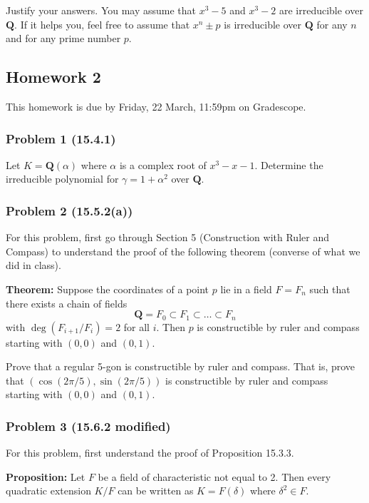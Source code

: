 \documentclass[11pt]{article}
\begin{document}
Justify your answers.
You may assume that \(x^3-5\) and \(x^3-2\) are irreducible over \(\mathbf{Q}\).  
If it helps you, feel free to assume that \(x^n \pm p\) is irreducible over \(\mathbf{Q}\) for any \(n\) and for any prime number \(p\).
\subsection{Homework 2}
\label{sec:org912c41e}
This homework is due by Friday, 22 March, 11:59pm on Gradescope.
\subsubsection{Problem 1 (15.4.1)}
\label{sec:orgced192a}

Let \(K = \mathbf{Q}(\alpha)\) where \(\alpha\) is a complex root of \(x^3-x-1\).
Determine the irreducible polynomial for \(\gamma = 1 + \alpha^2\) over \(\mathbf{Q}\).
\subsubsection{Problem 2 (15.5.2(a))}
\label{sec:org8074487}

For this problem, first go through Section 5 (Construction with Ruler and Compass) to understand the proof of the following theorem (converse of what we did in class).

\bigskip

\noindent
\textbf{\textbf{Theorem:}} Suppose the coordinates of a point \(p\) lie in a field \(F = F_n\) such that there exists a chain of fields
\[ \mathbf{Q} = F_0 \subset F_1 \subset \dots \subset F_n\]
with \(\deg (F_{i+1} / F_i) = 2\) for all \(i\).
Then \(p\) is constructible by ruler and compass starting with \((0,0)\) and \((0,1)\).

\bigskip

Prove that a regular 5-gon is constructible by ruler and compass.
That is, prove that \((\cos (2\pi/5), \sin (2\pi/5))\) is constructible by ruler and compass starting with \((0,0)\) and \((0,1)\).
\subsubsection{Problem 3 (15.6.2 modified)}
\label{sec:org7d3bacd}

For this problem, first understand the proof of Proposition 15.3.3.

\bigskip

\noindent
\textbf{\textbf{Proposition:}} Let \(F\) be a field of characteristic not equal to 2.  Then every quadratic extension \(K/F\) can be written as \(K = F(\delta)\) where \(\delta^2 \in F\).
\end{document}
